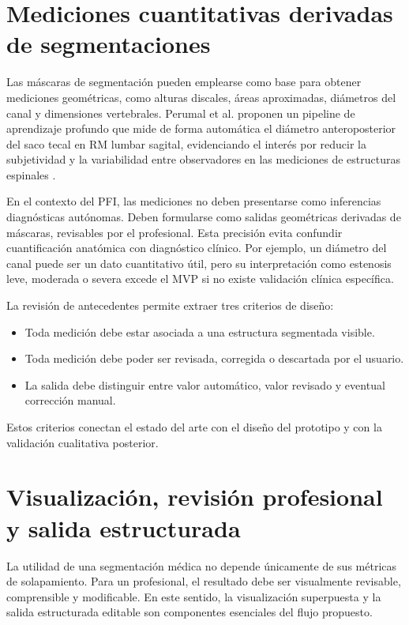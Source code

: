 \section{Mediciones cuantitativas derivadas de segmentaciones}

Las máscaras de segmentación pueden emplearse como base para obtener mediciones geométricas, como alturas discales, áreas aproximadas, diámetros del canal y dimensiones vertebrales. Perumal et al. proponen un pipeline de aprendizaje profundo que mide de forma automática el diámetro anteroposterior del saco tecal en RM lumbar sagital, evidenciando el interés por reducir la subjetividad y la variabilidad entre observadores en las mediciones de estructuras espinales \parencite{perumal_thecal_sac_2026}.

En el contexto del PFI, las mediciones no deben presentarse como inferencias diagnósticas autónomas. Deben formularse como salidas geométricas derivadas de máscaras, revisables por el profesional. Esta precisión evita confundir cuantificación anatómica con diagnóstico clínico. Por ejemplo, un diámetro del canal puede ser un dato cuantitativo útil, pero su interpretación como estenosis leve, moderada o severa excede el MVP si no existe validación clínica específica.

La revisión de antecedentes permite extraer tres criterios de diseño:

\begin{itemize}
  \item Toda medición debe estar asociada a una estructura segmentada visible.
  \item Toda medición debe poder ser revisada, corregida o descartada por el usuario.
  \item La salida debe distinguir entre valor automático, valor revisado y eventual corrección manual.
\end{itemize}

Estos criterios conectan el estado del arte con el diseño del prototipo y con la validación cualitativa posterior.

\section{Visualización, revisión profesional y salida estructurada}

La utilidad de una segmentación médica no depende únicamente de sus métricas de solapamiento. Para un profesional, el resultado debe ser visualmente revisable, comprensible y modificable. En este sentido, la visualización superpuesta y la salida estructurada editable son componentes esenciales del flujo propuesto.

